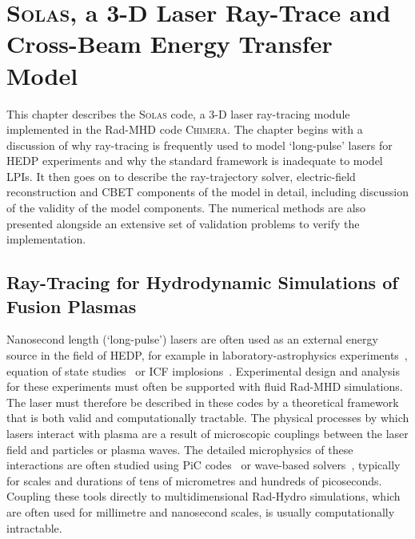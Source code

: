 \chapter{\textsc{Solas}, a 3-D Laser Ray-Trace and Cross-Beam Energy Transfer Model}%
\label{chap:SOLAS}

This chapter describes the \textsc{Solas} code, a 3-D laser ray-tracing module implemented in the \ac{Rad-MHD} code \textsc{Chimera}.
The chapter begins with a discussion of why ray-tracing is frequently used to model `long-pulse' lasers for \ac{HEDP} experiments and why the standard framework is inadequate to model \ac{LPIs}.
It then goes on to describe the ray-trajectory solver, electric-field reconstruction and \ac{CBET} components of the model in detail, including discussion of the validity of the model components.
The numerical methods are also presented alongside an extensive set of validation problems to verify the implementation.

\newpage

\section{Ray-Tracing for Hydrodynamic Simulations of Fusion Plasmas}%
\label{sec:SOLAS_raytracing_for_ICF}

Nanosecond length (`long-pulse') lasers are often used as an external energy source in the field of \ac{HEDP}, for example in laboratory-astrophysics experiments~\cite{tzeferacos_laboratory_2018,fiuza_electron_2020,meinecke_strong_2022}, equation of state studies~\cite{kritcher_measurement_2020,smith_ramp_2014} or \ac{ICF} implosions~\cite{zylstra_burning_2022,slutz_high-gain_2012,williams_demonstration_2024}.
Experimental design and analysis for these experiments must often be supported with fluid \ac{Rad-MHD} simulations.
The laser must therefore be described in these codes by a theoretical framework that is both valid and computationally tractable.
The physical processes by which lasers interact with plasma are a result of microscopic couplings between the laser field and particles or plasma waves.
The detailed microphysics of these interactions are often studied using \ac{PiC} codes~\cite{nguyen_cross-beam_2021} or wave-based solvers~\cite{myatt_wave-based_2017}, typically for scales and durations of tens of micrometres and hundreds of picoseconds.
Coupling these tools directly to multidimensional \ac{Rad-Hydro} simulations, which are often used for millimetre and nanosecond scales, is usually computationally intractable.

